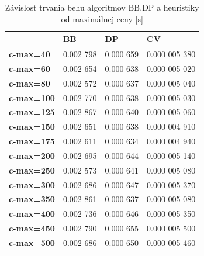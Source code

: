 \documentclass[slovak]{article}
\begin{document}
\begin{table}[htb!]\centering
	\begin{tabularx}{\textwidth}{ | X | X | X | X |}
	  \hline                       
							& \textbf{BB} 	& \textbf{DP} 	& \textbf{CV} 	\\ \hline
		\textbf{c-max=40}	&	0.002 798	&	0.000 659	&	0.000 005 380	\\ \hline
		\textbf{c-max=60}	&	0.002 654	&	0.000 638	&	0.000 005 020	\\ \hline
		\textbf{c-max=80}	&	0.002 572	&	0.000 637	&	0.000 005 040	\\ \hline
		\textbf{c-max=100}	&	0.002 770	&	0.000 638	&	0.000 005 030	\\ \hline
		\textbf{c-max=125}	&	0.002 867	&	0.000 640	&	0.000 005 060	\\ \hline
		\textbf{c-max=150}	&	0.002 651	&	0.000 638	&	0.000 004 910	\\ \hline
		\textbf{c-max=175}	&	0.002 611	&	0.000 634	&	0.000 004 940	\\ \hline
		\textbf{c-max=200}	&	0.002 695	&	0.000 644	&	0.000 005 140	\\ \hline
		\textbf{c-max=250}	&	0.002 573	&	0.000 641	&	0.000 005 080	\\ \hline
		\textbf{c-max=300}	&	0.002 686	&	0.000 647	&	0.000 005 370	\\ \hline
		\textbf{c-max=350}	&	0.002 861	&	0.000 637	&	0.000 005 080	\\ \hline
		\textbf{c-max=400}	&	0.002 736	&	0.000 646	&	0.000 005 350	\\ \hline
		\textbf{c-max=450}	&	0.002 790	&	0.000 655	&	0.000 005 500	\\ \hline								
		\textbf{c-max=500}	&	0.002 686	&	0.000 650	&	0.000 005 460	\\ \hline								
	\end{tabularx}
\caption{Závislosť trvania behu algoritmov BB,DP a heuristiky od maximálnej ceny [s]}
\label{tab3}
\end{table}
\end{document}

